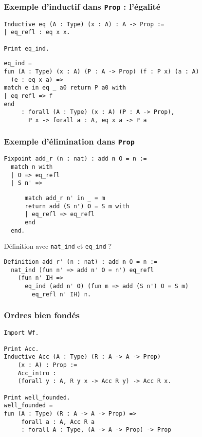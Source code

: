 \documentclass{beamer}
\begin{document}
\begin{frame}[fragile]
  \frametitle{Exemple d'inductif dans \texttt{Prop} : l'égalité}
\begin{verbatim}
Inductive eq (A : Type) (x : A) : A -> Prop :=
| eq_refl : eq x x.

Print eq_ind.
\end{verbatim}
\pause
\begin{verbatim}
eq_ind =
fun (A : Type) (x : A) (P : A -> Prop) (f : P x) (a : A)
  (e : eq x a) =>
match e in eq _ a0 return P a0 with
| eq_refl => f
end
     : forall (A : Type) (x : A) (P : A -> Prop),
       P x -> forall a : A, eq x a -> P a
\end{verbatim}
\end{frame}

\begin{frame}[fragile]
  \frametitle{Exemple d'élimination dans \texttt{Prop}}
\begin{verbatim}
Fixpoint add_r (n : nat) : add n O = n :=
  match n with
  | O => eq_refl
  | S n' =>
\end{verbatim}
\pause
\begin{verbatim}
      match add_r n' in _ = m
      return add (S n') O = S m with
      | eq_refl => eq_refl
      end
  end.
\end{verbatim}

Définition avec \texttt{nat_ind} et \texttt{eq_ind} ?
\pause
\begin{verbatim}
Definition add_r' (n : nat) : add n O = n :=
  nat_ind (fun n' => add n' O = n') eq_refl
    (fun n' IH =>
      eq_ind (add n' O) (fun m => add (S n') O = S m)
        eq_refl n' IH) n.
\end{verbatim}
\end{frame}

\begin{frame}[fragile]
  \frametitle{Ordres bien fondés}

\begin{verbatim}
Import Wf.

Print Acc.
Inductive Acc (A : Type) (R : A -> A -> Prop)
    (x : A) : Prop :=
    Acc_intro :
    (forall y : A, R y x -> Acc R y) -> Acc R x.

Print well_founded.
well_founded =
fun (A : Type) (R : A -> A -> Prop) =>
     forall a : A, Acc R a
     : forall A : Type, (A -> A -> Prop) -> Prop
\end{verbatim}
\end{frame}
\end{document}
